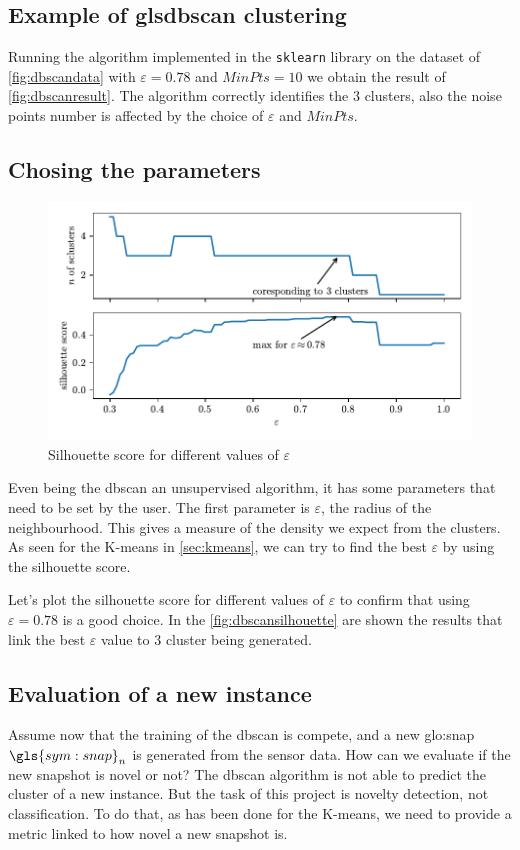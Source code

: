 \subsection{Example of gls{dbscan} clustering}
Running the algorithm implemented in the \texttt{sklearn} library on the dataset of \autoref{fig:dbscandata} with $\varepsilon = 0.78$ and $MinPts = 10$ we obtain the result of \autoref{fig:dbscanresult}. The algorithm correctly identifies the $3$ clusters, also the noise points number is affected by the choice of $\varepsilon$ and $MinPts$.

\subsection{Chosing the parameters}

\begin{figure}
    \centering
    \includegraphics{images/DBSCAN/Figure_4.pdf}
    \caption{Silhouette score for different values of $\varepsilon$}
    \label{fig:dbscansilhouette}
\end{figure}

Even being the \gls{dbscan} an unsupervised algorithm, it has some parameters that need to be set by the user.
The first parameter is $\varepsilon$, the radius of the neighbourhood. This gives a measure of the density we expect from the clusters. As seen for the K-means in \autoref{sec:kmeans}, we can try to find the best $\varepsilon$ by using the silhouette score.

Let's plot the silhouette score for different values of $\varepsilon$ to confirm that using $\varepsilon = 0.78$ is a good choice. In the \autoref{fig:dbscansilhouette} are shown the results that link the best $\varepsilon$ value to $3$ cluster being generated.

\subsection{Evaluation of a new instance}
Assume now that the training of the \gls{dbscan} is compete, and a new \gls{glo:snap} $\gls{sym:snap}_n$ is generated from the sensor data. How can we evaluate if the new snapshot is novel or not?
The \gls{dbscan} algorithm is not able to predict the cluster of a new instance. But the task of this project is novelty detection, not classification.
To do that, as has been done for the K-means, we need to provide a metric linked to how novel a new snapshot is. 

